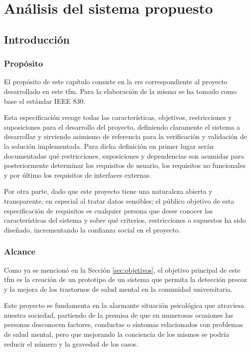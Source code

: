 \chapter{Análisis del sistema propuesto}
\label{chapter:analisis}


\section{Introducción}

    \subsection{Propósito}
        El propósito de este capítulo consiste en la \gls{ers} correspondiente al proyecto desarrollado en este \gls{tfm}. Para la elaboración de la misma se ha tomado como base el estándar IEEE 830.

        Esta especificación recoge todas las características, objetivos, restricciones y suposiciones para el desarrollo del proyecto, definiendo claramente el sistema a desarrollar y sirviendo asimismo de referencia para la verificación y validación de la solución implementada. Para dicha definición en primer lugar serán documentadas qué restricciones, suposiciones y dependencias son asumidas para posteriormente determinar los requisitos de usuario, los requisitos no funcionales y por último los requisitos de interfaces externas.

        Por otra parte, dado que este proyecto tiene una naturaleza abierta y transparente, en especial al tratar datos sensibles; el público objetivo de esta especificación de requisitos es cualquier persona que desee conocer las características del sistema y sobre qué criterios, restricciones o supuestos ha sido diseñado, incrementando la confianza social en el proyecto.
        
    \subsection{Alcance}
        \label{req:intro:alcance}
        Como ya se mencionó en la Sección \ref{sec:objetivos}, el objetivo principal de este \gls{tfm} es la creación de un prototipo de un sistema que permita la detección precoz y la mejora de los trastornos de salud mental en la comunidad universitaria. 

        Este proyecto se fundamenta en la alarmante situación psicológica que atraviesa nuestra sociedad, partiendo de la premisa de que en numerosas ocasiones las personas desconocen factores, conductas o síntomas relacionados con problemas de salud mental, pero que mejorando la conciencia de los mismos se podría reducir el número y la gravedad de los casos.

